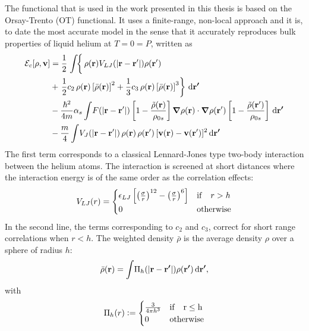 \documentclass[12pt,a4paper]{book}
\renewcommand{\vec}[1]{\bm{\mathrm{#1}}}
\newcommand{\diff}[1]{\,\mathrm{d}{\vec{#1}}}
\begin{document}
			The functional that is used in the work presented in this thesis is based on the Orsay-Trento (OT) functional. It uses a finite-range, non-local approach and it is, to date the most accurate model in the sense that it accurately reproduces bulk properties of liquid helium at $T=0=P$, written as		
			\begin{align}
				{\cal E}_c[\rho ,\mathbf{v}] &=  
				\frac{1}{2} \left.\int \! \right\{\rho({\bf r}) V_{LJ}(|{\bf r}-{\bf r'}|) \rho({\bf r'}) \nonumber \\
				&+ \left.\frac{1}{2} c_2\, \rho({\bf r}) \left[{\bar \rho}({\bf r}) \right]^2 
				+ \frac{1}{3} c_3 \, \rho({\bf r}) \left[ {\bar \rho}({\bf r}) \right]^3\right\}\diff{r'} \nonumber \\
				&- \frac{\hbar^2}{4m} \alpha_s \int \! F(|{\bf r}-{\bf r'}|) \left[ 1- \frac{{\tilde \rho}({\bf r})}{\rho_{0s}} \right]\grad{\rho({\bf r})} \cdot \grad{\rho({\bf r'})} \left[ 1- \frac{{\tilde \rho}({\bf r'})}{\rho_{0s}} \right]\diff{r'} \nonumber \\
				& - \frac{m}{4} \int \! V_J(| \mathbf{r} - \mathbf{r}'|)\, \rho(\mathbf{r}) \, \rho(\mathbf{r}')\,  [\mathbf{v}(\mathbf{r})-\mathbf{v}(\mathbf{r}')]^2\diff{r'} \label{eq:otf}
			\end{align}
			The first term corresponds to a classical Lennard-Jones type two-body interaction between the helium atoms. The interaction is screened at short distances where the interaction energy is of the same order as the correlation effects:
			\begin{align}
				V_{LJ}(r) = \begin{cases}
				\epsilon_{LJ} \left[\left(\frac{\sigma}{r} \right)^{12} - \left(\frac{\sigma}{r} \right)^{6} \right] & {\rm if} \quad r > h \\
				0 & {\rm otherwise}
				\end{cases}\label{eq9}
			\end{align}
			In the second line, the terms corresponding to $c_2$ and $c_3$, correct for short range correlations when $r<h$. The weighted density $\bar{\rho}$ is the average density $\rho$ over a sphere of radius $h$:
			\begin{align}
				\bar{\rho}(\vec{r}) = \int\!\Pi_h\qty(\abs{\vec{r}-\vec{r'}})\rho({\vec{r'}})\diff{r'},
			\end{align}
			with
			\begin{align}
				\Pi_h(r) \vcentcolon= \begin{cases}
					\frac{3}{4\pi h^3} & \rm{if} \quad r\leq h \\
					0 & \rm{otherwise}
				\end{cases}
			\end{align}
\end{document}
